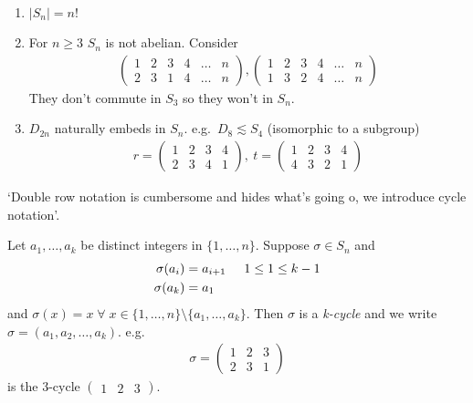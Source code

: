 \begin{remark}

~

\begin{enumerate}
\def\labelenumi{\roman{enumi}.}
\item
  \(|S_n| = n!\)
\item
  For \(n \geq 3\) \(S_n\) is not abelian.
  Consider
  \begin{align*}
  \begin{pmatrix}
  1 & 2 & 3 & 4 & \ldots & n \\
  2 & 3 & 1 & 4 & \ldots & n
  \end{pmatrix}, 
  \begin{pmatrix}
      1 & 2 & 3 & 4 & \ldots & n \\
      1 & 3 & 2 & 4 & \ldots & n
  \end{pmatrix}
  \end{align*}
  They don't commute in \(S_3\) so they won't in \(S_n\).
\item
  \(D_{2n}\) naturally embeds in \(S_n\).
  e.g.~\(D_8 \lesssim S_4\) (isomorphic to a subgroup)
  \begin{align*}
      r = \begin{pmatrix}
      1 & 2 & 3 & 4 \\
      2 & 3 & 4 & 1
      \end{pmatrix},\ t = 
      \begin{pmatrix}
      1 & 2 & 3 & 4 \\
      4 & 3 & 2 & 1
      \end{pmatrix}
  \end{align*}
\end{enumerate}

\end{remark}

`Double row notation is cumbersome and hides what's going o, we introduce cycle notation'.

\begin{definition}
Let \(a_1, \ldots, a_k\) be distinct integers in \(\{ 1, \ldots, n \}\).
Suppose \(\sigma \in S_n\) and
\begin{align*}
    \sigma(a_i) &= a_{i + 1} \hspace{0.5cm} 1 \leq 1 \leq k - 1 \\
    \sigma(a_k) &= a_1
\end{align*}
and \(\sigma(x) = x \; \forall \; x \in \{ 1, \ldots, n \} \setminus \{ a_1, \ldots, a_k \}\).
Then \(\sigma\) is a \emph{k-cycle} and we write \(\sigma = (a_1, a_2, \ldots, a_k)\).
e.g.~\begin{align*}
    \sigma = \begin{pmatrix}
    1 & 2 & 3 \\
    2 & 3 & 1
    \end{pmatrix}
\end{align*} is the 3-cycle \(\begin{pmatrix}1 & 2 & 3\end{pmatrix}\).
\end{definition}

